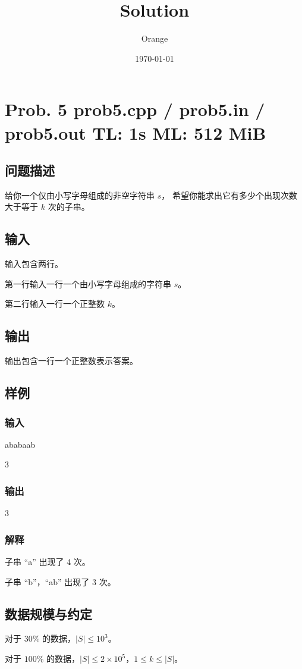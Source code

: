 \documentclass[UTF8]{article}
\title{Solution}
\author{Orange}
\date{\today}
\begin{document}
	\heiti

	\section{Prob. 5 \small {prob5.cpp / prob5.in / prob5.out} TL: 1s ML: 512 MiB}

	\subsection{问题描述}

	给你一个仅由小写字母组成的非空字符串 $s$，
	希望你能求出它有多少个出现次数大于等于 $k$ 次的子串。

	\subsection{输入}

	输入包含两行。

	第一行输入一行一个由小写字母组成的字符串 $s$。

	第二行输入一行一个正整数 $k$。

	\subsection{输出}

	输出包含一行一个正整数表示答案。

	\subsection{样例}

	\subsubsection{输入}

	ababaab

	3

	\subsubsection{输出}

	3

	\subsubsection{解释}

	子串 ``a'' 出现了 4 次。

	子串 ``b''，``ab'' 出现了 3 次。

	\subsection{数据规模与约定}

	对于 $30\%$ 的数据，$|S| \le 10^3$。

	对于 $100\%$ 的数据，$|S| \le 2 \times 10^5$，$1 \le k \le |S|$。
\end{document}
